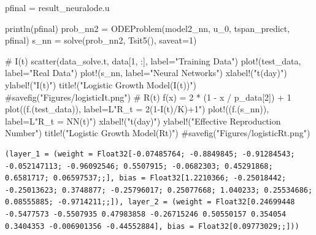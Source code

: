 \documentclass[
  letterpaper,
  DIV=11,
  numbers=noendperiod]{scrreport}
\newenvironment{Shaded}{\begin{snugshade}}{\end{snugshade}}
\newcommand{\CharTok}[1]{\textcolor[rgb]{0.13,0.47,0.30}{#1}}
\newcommand{\CommentTok}[1]{\textcolor[rgb]{0.37,0.37,0.37}{#1}}
\newcommand{\FloatTok}[1]{\textcolor[rgb]{0.68,0.00,0.00}{#1}}
\newcommand{\FunctionTok}[1]{\textcolor[rgb]{0.28,0.35,0.67}{#1}}
\newcommand{\NormalTok}[1]{\textcolor[rgb]{0.00,0.23,0.31}{#1}}
\newcommand{\OperatorTok}[1]{\textcolor[rgb]{0.37,0.37,0.37}{#1}}
\newcommand{\StringTok}[1]{\textcolor[rgb]{0.13,0.47,0.30}{#1}}
\begin{document}
\begin{Shaded}
\begin{Highlighting}[]
\NormalTok{pfinal }\OperatorTok{=}\NormalTok{ result\_neuralode.u}

\FunctionTok{println}\NormalTok{(pfinal)}
\NormalTok{prob\_nn2 }\OperatorTok{=} \FunctionTok{ODEProblem}\NormalTok{(model2\_nn, u\_0, tspan\_predict, pfinal)}
\NormalTok{s\_nn }\OperatorTok{=} \FunctionTok{solve}\NormalTok{(prob\_nn2, }\FunctionTok{Tsit5}\NormalTok{(), saveat}\OperatorTok{=}\FloatTok{1}\NormalTok{)}

\CommentTok{\# I(t)}
\FunctionTok{scatter}\NormalTok{(data\_solve.t, data[}\FloatTok{1}\NormalTok{, }\OperatorTok{:}\NormalTok{], label}\OperatorTok{=}\StringTok{"Training Data"}\NormalTok{)}
\FunctionTok{plot!}\NormalTok{(test\_data, label}\OperatorTok{=}\StringTok{"Real Data"}\NormalTok{)}
\FunctionTok{plot!}\NormalTok{(s\_nn, label}\OperatorTok{=}\StringTok{"Neural Networks"}\NormalTok{)}
\FunctionTok{xlabel!}\NormalTok{(}\StringTok{"t(day)"}\NormalTok{)}
\FunctionTok{ylabel!}\NormalTok{(}\StringTok{"I(t)"}\NormalTok{)}
\FunctionTok{title!}\NormalTok{(}\StringTok{"Logistic Growth Model(I(t))"}\NormalTok{)}
\CommentTok{\#savefig("Figures/logisticIt.png")}
\CommentTok{\# R(t)}
\FunctionTok{f}\NormalTok{(x) }\OperatorTok{=} \FloatTok{2} \OperatorTok{*}\NormalTok{ (}\FloatTok{1} \OperatorTok{{-}}\NormalTok{ x }\OperatorTok{/}\NormalTok{ p\_data[}\FloatTok{2}\NormalTok{]) }\OperatorTok{+} \FloatTok{1}
\FunctionTok{plot}\NormalTok{((}\FunctionTok{f}\NormalTok{.(test\_data))}\CharTok{\textquotesingle{}, label=L"R\_t = 2(1{-}I(t)/K)+1")}
\FunctionTok{plot!}\NormalTok{((}\FunctionTok{f}\NormalTok{.(s\_nn))}\CharTok{\textquotesingle{}, label=L"R\_t = NN(t)")}
\FunctionTok{xlabel!}\NormalTok{(}\StringTok{"t(day)"}\NormalTok{)}
\FunctionTok{ylabel!}\NormalTok{(}\StringTok{"Effective Reproduction Number"}\NormalTok{)}
\FunctionTok{title!}\NormalTok{(}\StringTok{"Logistic Growth Model(Rt)"}\NormalTok{)}
\CommentTok{\#savefig("Figures/logisticRt.png")}
\end{Highlighting}
\end{Shaded}

\begin{verbatim}
(layer_1 = (weight = Float32[-0.07485764; -0.8849845; -0.91284543; -0.052147113; -0.96092546; 0.5507915; -0.0682303; 0.45291868; 0.6581717; 0.06597537;;], bias = Float32[1.2210366; -0.25018442; -0.25013623; 0.3748877; -0.25796017; 0.25077668; 1.040233; 0.25534686; 0.08555885; -0.9714211;;]), layer_2 = (weight = Float32[0.24699448 -0.5477573 -0.5507935 0.47983858 -0.26715246 0.50550157 0.354054 0.3404353 -0.006901356 -0.44552884], bias = Float32[0.09773029;;]))
\end{verbatim}
\end{document}
